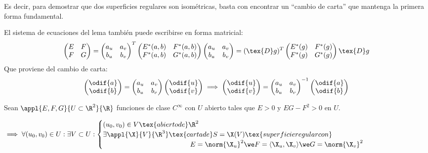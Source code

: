 Es decir, para demostrar que dos superficies regulares son isométricas, basta con encontrar un ``cambio de carta'' que mantenga la primera forma fundamental.

El sistema de ecuaciones del lema también puede escribirse en forma matricial:
\[\begin{pmatrix}
		E & F \\
		F & G
	\end{pmatrix} = \begin{pmatrix}
		a_u & a_v \\
		b_u & b_v
	\end{pmatrix}^T \begin{pmatrix}
		E^*(a,b) & F^*(a,b) \\
		F^*(a,b) & G^*(a,b)
	\end{pmatrix} \begin{pmatrix}
		a_u & a_v \\
		b_u & b_v
	\end{pmatrix} = (\tex{D}g)^T \begin{pmatrix}
		E^*(g) & F^*(g) \\
		F^*(g) & G^*(g)
	\end{pmatrix} \tex{D}g\]
Que proviene del cambio de carta:
\[\begin{pmatrix}
		\odif{a} \\
		\odif{b}
	\end{pmatrix} = \begin{pmatrix}
		a_u & a_v \\
		b_u & b_v
	\end{pmatrix} \begin{pmatrix}
		\odif{u} \\
		\odif{v}
	\end{pmatrix} \implies \begin{pmatrix}
		\odif{u} \\
		\odif{v}
	\end{pmatrix} = \begin{pmatrix}
		a_u & a_v \\
		b_u & b_v
	\end{pmatrix}^{-1} \begin{pmatrix}
		\odif{a} \\
		\odif{b}
	\end{pmatrix}\]

\begin{teo}
	Sean $\appl{E, F, G}{U \subset \R^2}{\R}$ funciones de clase $C^\infty$ con $U$ abierto tales que $E > 0$ y $EG - F^2 > 0$ en $U$.

	$\implies \forall (u_0, v_0) \in U : \exists V \subset U : \begin{cases}
			(u_0, v_0) \in V \tex{ abierto de } \R^2                                         \\
			\exists \appl{\X}{V}{\R^3} \tex{ carta de }S=\X(V) \tex{ superficie regular con} \\
			\phantom{\exists \appl{\X}{V}{\R^3}\tex{ }} E = \norm{\X_u}^2 \we F = \langle \X_u, \X_v \rangle \we G = \norm{\X_v}^2
		\end{cases}$
\end{teo}

